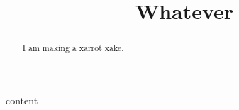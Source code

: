 \documentclass{ximera}
\title{Whatever}
\begin{document}
\begin{abstract}
I am making a xarrot xake.
\end{abstract}
content
\end{document}
